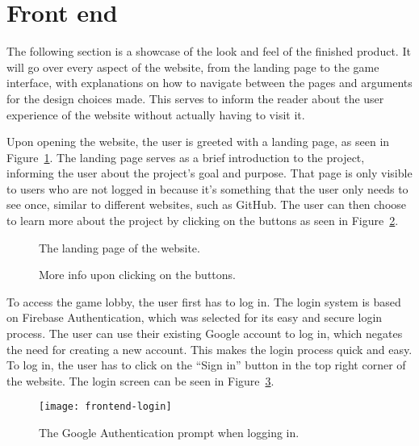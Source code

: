 \section{Front end}\label{sec:frontend}

The following section is a showcase of the look and feel of the finished product.
It will go over every aspect of the website, from the landing page to the game interface, with explanations on how to
navigate between the pages and arguments for the design choices made.
This serves to inform the reader about the user experience of the website without actually having to visit it.

Upon opening the website, the user is greeted with a landing page, as seen in Figure~\ref{fig:home}.
The landing page serves as a brief introduction to the project, informing the user about the project's goal and purpose.
That page is only visible to users who are not logged in because it's something that the user only needs to see once,
similar to different websites, such as GitHub.
The user can then choose to learn more about the project by clicking on the buttons as seen in
Figure~\ref{fig:home-info}.

\begin{figure}[H]
    \centering
    \setlength{\fboxsep}{0pt}
    \caption{The landing page of the website.}\label{fig:home}
\end{figure}

\begin{figure}[H]
    \centering
    \setlength{\fboxsep}{0pt}
    \caption{More info upon clicking on the buttons.}\label{fig:home-info}
\end{figure}

To access the game lobby, the user first has to log in.
The login system is based on Firebase Authentication, which was selected for its easy and secure login process.
The user can use their existing Google account to log in, which negates the need for creating a new account.
This makes the login process quick and easy.
To log in, the user has to click on the ``Sign in'' button in the top right corner of the website.
The login screen can be seen in Figure~\ref{fig:login}.

\begin{figure}[H]
    \centering
    \texttt{[image: frontend-login]}
    \caption{The Google Authentication prompt when logging in.}\label{fig:login}
\end{figure}


